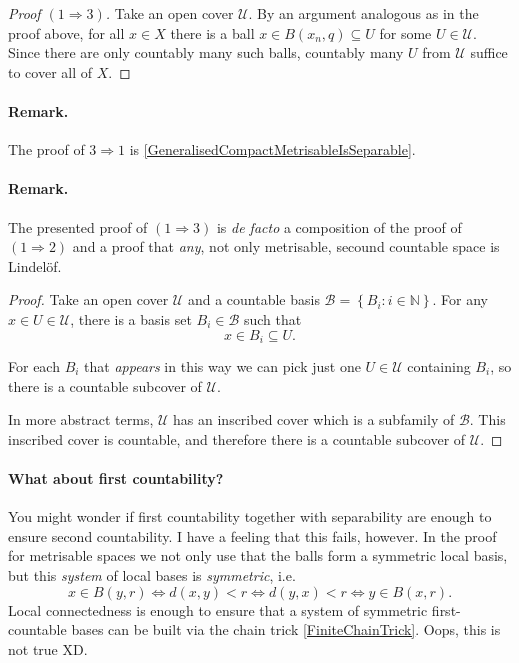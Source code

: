 \begin{proof}[Proof \( (1 \Rightarrow 3) \)]
    Take an open cover \( \mathcal{U} \). By an argument analogous as in the proof above, for all \( x \in X \) there is a ball \(x \in B(x_n, q) \subseteq U \) for some \( U \in \mathcal{U} \). Since there are only countably many such balls, countably many \( U \) from \( \mathcal{U} \) suffice to cover all of \( X \).
\end{proof}

\paragraph{Remark.} The proof of \( 3 \Rightarrow 1 \) is \ref{GeneralisedCompactMetrisableIsSeparable}. 

\paragraph{Remark.} The presented proof of \( (1 \Rightarrow 3) \) is \emph{de facto} a composition of the proof of \( (1 \Rightarrow 2) \) and a proof that \emph{any}, not only metrisable, secound countable space is Lindel\"of.


\begin{proof}
Take an open cover \( \mathcal{U} \) and a countable basis \( \mathcal{B} = \left\{ B_i : i \in \mathbb{N} \right\} \). For any \( x \in U \in \mathcal{U} \), there is a basis set \( B_i \in \mathcal{B}\) such that
\[ 
    x \in B_i \subseteq U.
\]

For each \( B_i \) that \emph{appears} in this way we can pick just one \( U \in \mathcal{U} \) containing \( B_i \), so there is a countable subcover of \( \mathcal{U} \).

In more abstract terms, \( \mathcal{U} \) has an inscribed cover which is a subfamily of \( \mathcal{B} \). This inscribed cover is countable, and therefore there is a countable subcover of \( \mathcal{U} \).
\end{proof}

\paragraph{What about first countability?} You might wonder if first countability together with separability are enough to ensure second countability. I have a feeling that this fails, however. In the proof for metrisable spaces we not only use that the balls form a symmetric local basis, but this \emph{system} of local bases is \emph{symmetric}, i.e.
\[ 
    x \in B(y, r) \iff d(x,y) < r \iff d(y, x) < r \iff y \in B(x, r).
\]
Local connectedness is enough to ensure that a system of symmetric first-countable bases can be built via the chain trick \ref{FiniteChainTrick}. Oops, this is not true XD.

